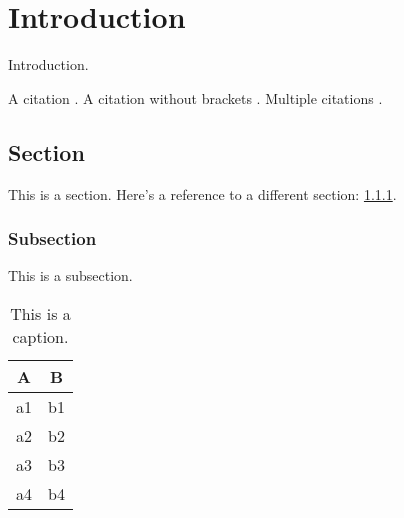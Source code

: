 \chapter{Introduction}
\label{sec:intro}

Introduction.

A citation \cite{A}. 
A citation without brackets . 
Multiple citations \cite{A, B, C}.

\section{Section}
\label{sec:section}

This is a section.  Here's a reference to a different section:
\ref{sec:subsection}.

\subsection{Subsection}
\label{sec:subsection}

This is a subsection.

\makeatletter
\let\@currsize\normalsize
\makeatother

\begin{table}[bt]
\begin{center}
\begin{tabular}{cc}
\hline
A & B \\
\hline
a1 & b1 \\
a2 & b2 \\
a3 & b3 \\
a4 & b4 \\
\hline
\end{tabular}
\end{center}
\caption{This is a caption.}
\label{tab:pfams}
\end{table}
